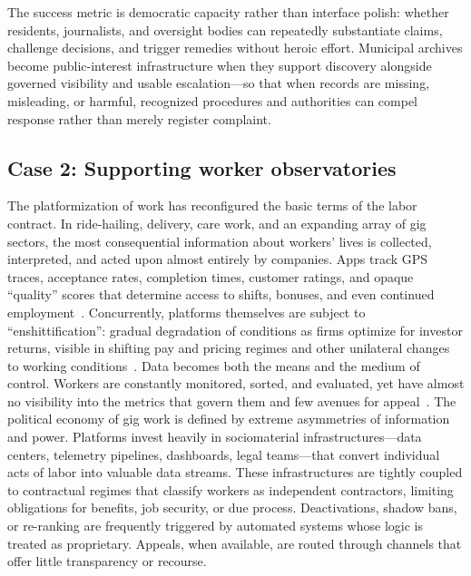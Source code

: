 \documentclass[acmsmall,screen]{acmart}
\begin{document}
The success metric is democratic capacity rather than interface polish: whether residents, journalists, and oversight bodies can repeatedly substantiate claims, challenge decisions, and trigger remedies without heroic effort. Municipal archives become public-interest infrastructure when they support discovery alongside governed visibility and usable escalation---so that when records are missing, misleading, or harmful, recognized procedures and authorities can compel response rather than merely register complaint.

\subsection*{Case 2: Supporting worker observatories}

The platformization of work has reconfigured the basic terms of the labor contract. In ride-hailing, delivery, care work, and an expanding array of gig sectors, the most consequential information about workers' lives is collected, interpreted, and acted upon almost entirely by companies. Apps track GPS traces, acceptance rates, completion times, customer ratings, and opaque ``quality'' scores that determine access to shifts, bonuses, and even continued employment~\cite{jarrahiAlgorithmicManagementWork2021}. Concurrently, platforms themselves are subject to ``enshittification'': gradual degradation of conditions as firms optimize for investor returns, visible in shifting pay and pricing regimes and other unilateral changes to working conditions~\cite{binnsNotEvenNice2025}. Data becomes both the means and the medium of control. Workers are constantly monitored, sorted, and evaluated, yet have almost no visibility into the metrics that govern them and few avenues for appeal~\cite{jarrahiAlgorithmicManagementWork2021,steinYouAreYou2023}. The political economy of gig work is defined by extreme asymmetries of information and power. Platforms invest heavily in sociomaterial infrastructures---data centers, telemetry pipelines, dashboards, legal teams---that convert individual acts of labor into valuable data streams. These infrastructures are tightly coupled to contractual regimes that classify workers as independent contractors, limiting obligations for benefits, job security, or due process. Deactivations, shadow bans, or re-ranking are frequently triggered by automated systems whose logic is treated as proprietary. Appeals, when available, are routed through channels that offer little transparency or recourse.
\end{document}
